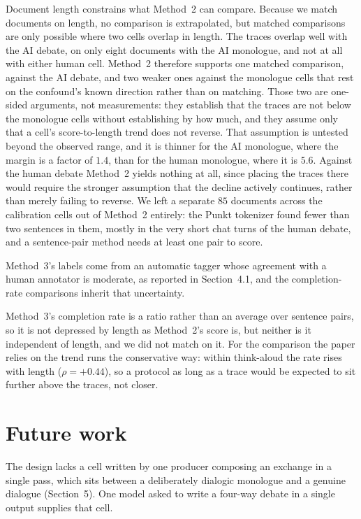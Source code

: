 \documentclass[10pt,twocolumn]{article}
\begin{document}
Document length constrains what Method~2 can compare. Because we match documents on length, no
comparison is extrapolated, but matched comparisons are only possible where two cells overlap in
length. The traces overlap well with the AI debate, on only eight documents with the AI monologue,
and not at all with either human cell. Method~2 therefore supports one matched comparison, against
the AI debate, and two weaker ones against the monologue cells that rest on the confound's known
direction rather than on matching. Those two are one-sided arguments, not measurements: they
establish that the traces are not below the monologue cells without establishing by how much, and
they assume only that a cell's score-to-length trend does not reverse. That
assumption is untested beyond the observed range, and it is thinner for the AI monologue, where the
margin is a factor of $1.4$, than for the human monologue, where it is $5.6$. Against the human
debate Method~2 yields nothing at all, since placing the traces there would require the stronger
assumption that the decline actively continues, rather than merely failing to reverse. We left a
separate $85$ documents across the calibration cells out of Method~2
entirely: the Punkt tokenizer found fewer than two sentences in them, mostly in the very short chat
turns of the human debate, and a sentence-pair method needs at least one pair to score.

Method~3's labels come from an automatic tagger whose agreement with a human annotator is moderate,
as reported in Section~4.1, and the completion-rate comparisons inherit that uncertainty.

Method~3's completion rate is a ratio rather than an average over sentence pairs, so it is not
depressed by length as Method~2's score is, but neither is it independent of length, and we did not
match on it. For the comparison the paper relies on the trend runs the conservative way: within
think-aloud the rate rises with length ($\rho=+0.44$), so a protocol as long as a trace would be
expected to sit further above the traces, not closer.

\section{Future work}
The design lacks a cell written by one producer composing an exchange in a single pass, which sits
between a deliberately dialogic monologue and a genuine dialogue (Section~5). One model asked to
write a four-way debate in a single output supplies that cell.
\end{document}
